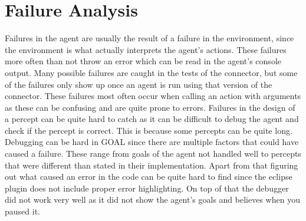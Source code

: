 \section{Failure Analysis}
Failures in the agent are usually the result of a failure in the environment, since the environment is what actually interprets the agent's actions.
These failures more often than not throw an error which can be read in the agent's console output.
Many possible failures are caught in the tests of the connector, but some of the failures only show up once an agent is run using that version of the connector.
These failures most often occur when calling an action with arguments as these can be confusing and are quite prone to errors.
Failures in the design of a percept can be quite hard to catch as it can be difficult to debug the agent and check if the percept is correct. This is because some percepts can be quite long.
Debugging can be hard in GOAL since there are multiple factors that could have caused a failure. These range from goals of the agent not handled well to percepts that were different than stated in their implementation.
Apart from that figuring out what caused an error in the code can be quite hard to find since the eclipse plugin does not include proper error highlighting. On top of that the debugger did not work very well as it did not show the agent's goals and believes when you paused it.
